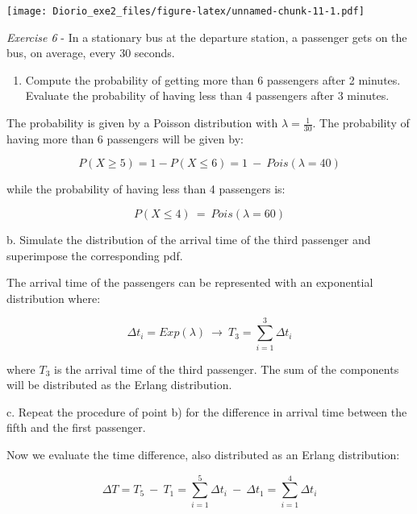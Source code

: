 \documentclass[
]{article}
\providecommand{\tightlist}{%
  \setlength{\itemsep}{0pt}\setlength{\parskip}{0pt}}
\begin{document}
\texttt{[image: Diorio\_exe2\_files/figure-latex/unnamed-chunk-11-1.pdf]}

\emph{Exercise 6} - In a stationary bus at the departure station, a
passenger gets on the bus, on average, every 30 seconds.

\begin{enumerate}
\def\labelenumi{\alph{enumi})}
\tightlist
\item
  Compute the probability of getting more than 6 passengers after 2
  minutes. Evaluate the probability of having less than 4 passengers
  after 3 minutes.
\end{enumerate}

The probability is given by a Poisson distribution with
\(\lambda = \frac{1}{30}\). The probability of having more than 6
passengers will be given by:

\[
P(X \ge 5) = 1 - P(X \le 6) = 1 \ - \ Pois(\lambda = 40)
\]

while the probability of having less than 4 passengers is:

\[
P(X \le 4) \ = \ Pois(\lambda = 60)
\]

b. Simulate the distribution of the arrival time of the third passenger
and superimpose the corresponding pdf.

The arrival time of the passengers can be represented with an
exponential distribution where:

\[
\Delta t_i = Exp(\lambda) \ \rightarrow \ T_3 = \sum_{i=1}^3 \Delta t_i 
\]

where \(T_3\) is the arrival time of the third passenger. The sum of the
components will be distributed as the Erlang distribution.

c. Repeat the procedure of point b) for the difference in arrival time
between the fifth and the first passenger.

Now we evaluate the time difference, also distributed as an Erlang
distribution:

\[
\Delta T = T_5 \ - \ T_1 = \sum_{i=1}^5\Delta t_i \ - \ \Delta t_1 = \sum_{i=1}^4 \Delta t_i
\]
\end{document}
